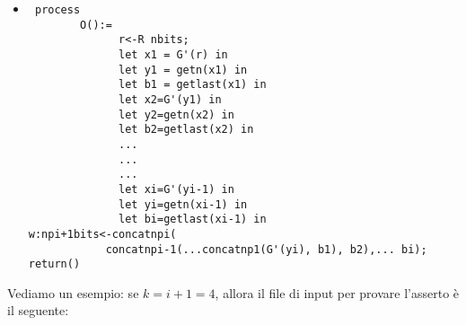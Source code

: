 \documentclass[a4paper,openright,twoside,12pt]{report}
\begin{document}
\begin{enumerate}
\begin{itemize}
 \item \begin{verbatim}
 process
        O():=
              r<-R nbits;
              let x1 = G'(r) in
              let y1 = getn(x1) in
              let b1 = getlast(x1) in
              let x2=G'(y1) in
              let y2=getn(x2) in
              let b2=getlast(x2) in
              ...
              ...
              ...
              let xi=G'(yi-1) in
              let yi=getn(xi-1) in
              let bi=getlast(xi-1) in
w:npi+1bits<-concatnpi(
            concatnpi-1(...concatnp1(G'(yi), b1), b2),... bi);
return()
\end{verbatim}
\end{itemize}
\end{enumerate}

Vediamo un esempio: se $k=i+1=4$, allora il file di input per provare l'asserto \`e il seguente:
\end{document}
